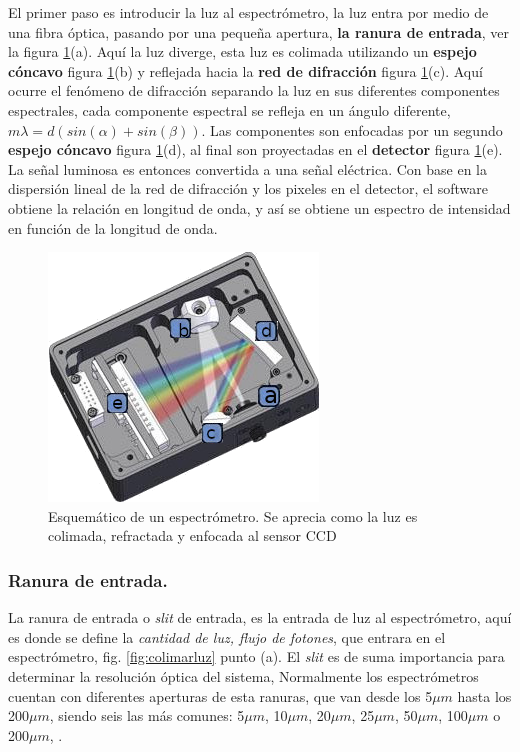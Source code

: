 El primer paso es introducir la luz al espectrómetro, la luz entra por medio de una fibra óptica, pasando por una pequeña apertura, \textbf{la ranura de entrada}, ver la figura \ref{fig:esquematicoespectrometro}(a). Aquí la luz diverge, esta luz es colimada utilizando un \textbf{espejo cóncavo} figura \ref{fig:esquematicoespectrometro}(b) y reflejada hacia la \textbf{red de difracción} figura \ref{fig:esquematicoespectrometro}(c). Aquí ocurre el fenómeno de difracción separando la luz en sus diferentes componentes espectrales, cada componente espectral se refleja en un ángulo diferente, $m\lambda = d(sin(\alpha)+sin(\beta)) $. Las componentes son enfocadas por un segundo \textbf{espejo cóncavo} figura \ref{fig:esquematicoespectrometro}(d), al final son proyectadas en el \textbf{detector} figura \ref{fig:esquematicoespectrometro}(e). La señal luminosa es entonces convertida a una señal eléctrica. Con base en la dispersión lineal
de la red de difracción y los pixeles en el detector, el software obtiene la relación en
longitud de onda, y así se obtiene un espectro de intensidad en función de la longitud de onda.

\begin{figure}[h]
	\centering
	\includegraphics[width=0.55\linewidth]{Imagenes/Espectrometro}
	\caption[Esquema de un espectrómetro.]{Esquemático de un espectrómetro. Se aprecia como la luz es colimada, refractada y enfocada al sensor CCD \cite{BWTEK}}
	\label{fig:esquematicoespectrometro}
\end{figure}

\subsubsection{Ranura de entrada.}
La ranura de entrada o \textit{slit} de entrada, es la entrada de luz al espectrómetro, aquí es donde se define la \textit{cantidad de luz, flujo de fotones}, que entrara en el espectrómetro, fig. \ref{fig:colimarluz} punto (a).
El \textit{slit} es de suma importancia para determinar la resolución óptica del sistema, Normalmente los espectrómetros cuentan con diferentes aperturas de esta ranuras, que van desde los 5$\mu m$ hasta los 200$\mu m$, siendo seis las más comunes: 5$\mu m$, 10$\mu m$, 20$\mu m$, 25$\mu m$, 50$\mu m$, 100$\mu m$ o 200$\mu m$, \cite{Oceana}.

